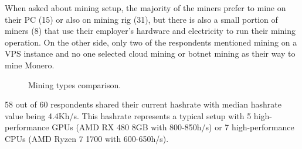 \documentclass[
  printed, %
  table,   %
  lof,     %
  lot,     %
           oneside, color
]{fithesis3}
\begin{document}
When asked about mining setup, the majority of the miners prefer to mine on their  PC (15) or also on mining rig (31), but there is also a small portion of miners (8) that use their employer's hardware and electricity to run their mining operation. On the other side, only two of the respondents mentioned mining on a VPS instance and no one selected cloud mining or botnet mining as their way to mine Monero.
\vspace{-1em}
\begin{center}
\begin{figure}[H]
\caption{Mining types comparison.}
\label{chart:miningtype}\end{figure}\end{center}
\vspace{-2em}
58 out of 60 respondents shared their current hashrate with median hashrate value being 4.4Kh/s. This hashrate represents a typical setup with 5 high-performance  GPUs (AMD RX 480 8GB with 800-850h/s) or 7 high-performance CPUs (AMD Ryzen 7 1700 with 600-650h/s).
\end{document}
